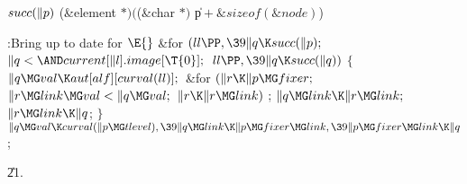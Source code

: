 \B\D$\\{succ}(\|p)$ \5
(\&{element} ${}{*})({}$(\&{char} ${}{*}){}$ \|p${}+\&{sizeof}(\&{node}){}$)\par
\Y\B\4:Bring  up to date for %
\X${}\E{}$\6
\&{for} ${}(\\{ll}\PP,\39\|q\K\\{succ}(\|p);{}$ ${}\|q<{\AND}\\{current}[\|l].%
\\{image}[\T{0}];{}$ ${}\\{ll}\PP,\39\|q\K\\{succ}(\|q)){}$\5
${}\{{}$\1\6
${}\|q\MG\\{val}\K\\{aut}[\\{alf}][\\{curval}(\\{ll})];{}$\6
\&{for} ${}(\|r\K\|p\MG\\{fixer};{}$ ${}\|r\MG\\{link}\MG\\{val}<\|q\MG%
\\{val};{}$ ${}\|r\K\|r\MG\\{link}){}$\1\5
;\2\6
${}\|q\MG\\{link}\K\|r\MG\\{link};{}$\6
${}\|r\MG\\{link}\K\|q{}$;\6
\4${}\}{}$\2\6
${}\|q\MG\\{val}\K\\{curval}(\|p\MG\\{tlevel}),\39\|q\MG\\{link}\K\|p\MG%
\\{fixer}\MG\\{link},\39\|p\MG\\{fixer}\MG\\{link}\K\|q{}$;\par
\U21.\fi

